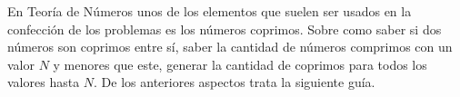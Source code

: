 En Teoría de Números unos de los elementos que suelen ser usados en la confección de los problemas es los números coprimos. Sobre como saber si dos números son coprimos entre sí, saber la cantidad de números comprimos con un valor $N$ y menores que este, generar la cantidad de coprimos para todos los valores hasta $N$. De los anteriores aspectos trata la siguiente guía.